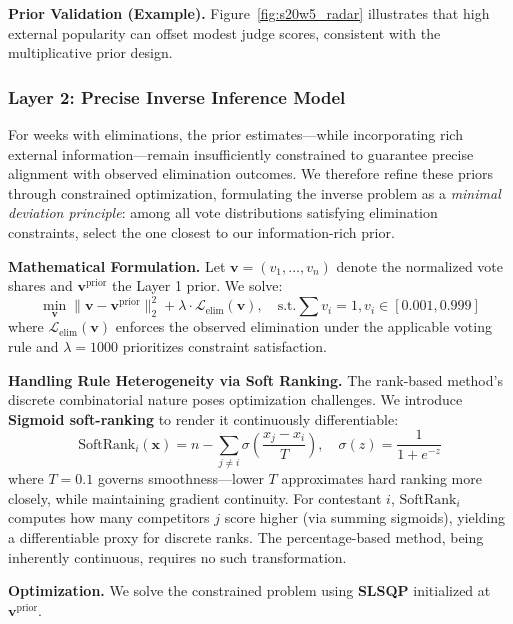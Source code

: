 \textbf{Prior Validation (Example).} Figure~\ref{fig:s20w5_radar} illustrates that high external popularity can offset modest judge scores, consistent with the multiplicative prior design.



\subsubsection{Layer 2: Precise Inverse Inference Model}

For weeks with eliminations, the prior estimates---while incorporating rich external information---remain insufficiently constrained to guarantee precise alignment with observed elimination outcomes. We therefore refine these priors through constrained optimization, formulating the inverse problem as a \textit{minimal deviation principle}: among all vote distributions satisfying elimination constraints, select the one closest to our information-rich prior.

\textbf{Mathematical Formulation.} Let $\mathbf{v} = (v_1, \ldots, v_n)$ denote the normalized vote shares and $\mathbf{v}^{\text{prior}}$ the Layer 1 prior. We solve:
\begin{equation}
\min_{\mathbf{v}} \|\mathbf{v} - \mathbf{v}^{\text{prior}}\|_2^2 + \lambda \cdot \mathcal{L}_{\text{elim}}(\mathbf{v}), \quad \text{s.t.} \sum v_i = 1, v_i \in [0.001, 0.999]
\end{equation}
where $\mathcal{L}_{\text{elim}}(\mathbf{v})$ enforces the observed elimination under the applicable voting rule and $\lambda=1000$ prioritizes constraint satisfaction.

\textbf{Handling Rule Heterogeneity via Soft Ranking.} The rank-based method's discrete combinatorial nature poses optimization challenges. We introduce \textbf{Sigmoid soft-ranking} to render it continuously differentiable:
\begin{equation}
\text{SoftRank}_i(\mathbf{x}) = n - \sum_{j \neq i} \sigma\left(\frac{x_j - x_i}{T}\right), \quad \sigma(z) = \frac{1}{1 + e^{-z}}
\end{equation}
where $T = 0.1$ governs smoothness---lower $T$ approximates hard ranking more closely, while maintaining gradient continuity. For contestant $i$, $\text{SoftRank}_i$ computes how many competitors $j$ score higher (via summing sigmoids), yielding a differentiable proxy for discrete ranks. The percentage-based method, being inherently continuous, requires no such transformation.

\textbf{Optimization.} We solve the constrained problem using \textbf{SLSQP} initialized at $\mathbf{v}^{\text{prior}}$.

